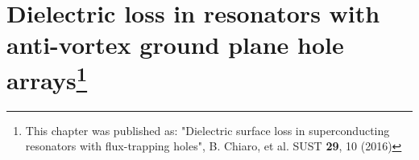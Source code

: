 \chapter[Dielectric loss in resonators with anti-vortex ground plane hole arrays]{Dielectric loss in resonators with anti-vortex ground plane hole arrays\footnote{This chapter was published as: "Dielectric surface loss in superconducting resonators with flux-trapping holes",  B. Chiaro, et al. SUST \textbf{29}, 10 (2016)}}
\label{ch:vortex}


%
\def \Bcapp {\text{B}^{\textrm{cool}}_{\textrm{applied}}}
\def \Qtlsparticipation {1/Q_{\text{TLS}} = \Sigma_{i}\, p_i \tan \delta_i}

